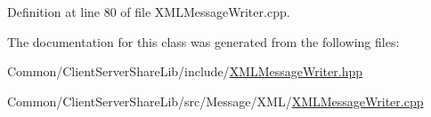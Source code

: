 Definition at line 80 of file X\+M\+L\+Message\+Writer.\+cpp.



The documentation for this class was generated from the following files\+:\begin{DoxyCompactItemize}
\item 
Common/\+Client\+Server\+Share\+Lib/include/\hyperlink{_x_m_l_message_writer_8hpp}{X\+M\+L\+Message\+Writer.\+hpp}\item 
Common/\+Client\+Server\+Share\+Lib/src/\+Message/\+X\+M\+L/\hyperlink{_x_m_l_message_writer_8cpp}{X\+M\+L\+Message\+Writer.\+cpp}\end{DoxyCompactItemize}
